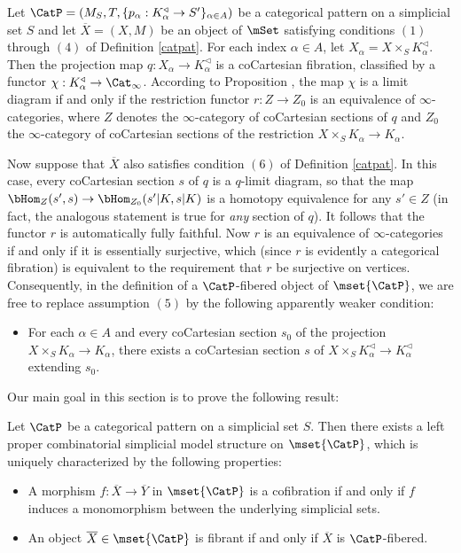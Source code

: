 \begin{remark}\label{ratpat}
Let $\CatP = (M_S, T, \{ p_{\alpha}: K_{\alpha}^{\triangleleft} \rightarrow S' \}_{\alpha \in A})$ be a categorical pattern on a simplicial set $S$ and let $\overline{X} = (X,M)$ be an object of $\mSet$ satisfying conditions $(1)$ through $(4)$ of Definition \ref{catpat}. For each index $\alpha \in A$, let
$X_{\alpha} = X \times_{S} K_{\alpha}^{\triangleleft}$. Then the projection map
$q: X_{\alpha} \rightarrow K_{\alpha}^{\triangleleft}$ is a coCartesian fibration, classified by a functor
$\chi: K_{\alpha}^{\triangleleft} \rightarrow \Cat_{\infty}$. According to Proposition , the map $\chi$ is a limit diagram if and only if the restriction functor $r: Z \rightarrow Z_0$ is an equivalence of $\infty$-categories, where $Z$ denotes the $\infty$-category of coCartesian sections of $q$ and $Z_0$ the $\infty$-category of coCartesian sections of the restriction
$X \times_{S} K_{\alpha} \rightarrow K_{\alpha}$. 

Now suppose that $\overline{X}$ also satisfies condition $(6)$ of Definition \ref{catpat}. In this case,
every coCartesian section $s$ of $q$ is a $q$-limit diagram, so that the map
$\bHom_{Z}(s',s) \rightarrow \bHom_{Z_0}(s' |K ,s|K)$ is a homotopy equivalence for
any $s' \in Z$ (in fact, the analogous statement is true for {\em any} section of $q$). 
It follows that the functor $r$ is automatically fully faithful. Now $r$ is an equivalence of $\infty$-categories if and only if it is essentially surjective, which (since $r$ is evidently a categorical fibration) is equivalent to the requirement that $r$ be surjective on vertices. Consequently, in the definition of
a $\CatP$-fibered object of $\mset{ \CatP}$, we are free to replace assumption $(5)$ by the following apparently weaker condition:
\begin{itemize}
\item[$(5')$] For each $\alpha \in A$ and every coCartesian section $s_0$ of the projection
$X \times_{S} K_{\alpha} \rightarrow K_{\alpha}$, there exists a coCartesian section $s$ of
$X \times_{S} K_{\alpha}^{\triangleleft} \rightarrow K_{\alpha}^{\triangleleft}$ extending
$s_0$.
\end{itemize}
\end{remark}

Our main goal in this section is to prove the following result:

\begin{theorem}\label{theo}
Let $\CatP$ be a categorical pattern on a simplicial set $S$. Then there exists a left proper combinatorial simplicial model structure on $\mset{\CatP}$, which is uniquely characterized by the following properties:
\begin{itemize}
\item[$(C)$] A morphism $f: \overline{X} \rightarrow \overline{Y}$ in $\mset{ \CatP}$ is a cofibration
if and only if $f$ induces a monomorphism between the underlying simplicial sets.
\item[$(F)$] An object $\overline{X} \in \mset{ \CatP}$ is fibrant if and only if
$\overline{X}$ is $\CatP$-fibered.
\end{itemize}
\end{theorem}

